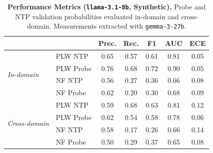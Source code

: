 \begin{table}[ht]
\centering
\begin{tabular}{ll ccccc}
\toprule
& & Prec. & Rec. & F1 & AUC & ECE \\
\midrule
\multirow{4}{*}{\textit{In-domain}}
& PLW NTP & 0.65 & 0.57 & 0.61 & 0.81 & 0.05 \\
& PLW Probe & 0.76 & 0.68 & 0.72 & 0.90 & 0.05 \\
& NF NTP & 0.56 & 0.27 & 0.36 & 0.66 & 0.08 \\
& NF Probe & 0.62 & 0.20 & 0.30 & 0.68 & 0.09 \\
\midrule
\multirow{4}{*}{\textit{Cross-domain}}
& PLW NTP & 0.59 & 0.68 & 0.63 & 0.81 & 0.12 \\
& PLW Probe & 0.62 & 0.54 & 0.58 & 0.78 & 0.06 \\
& NF NTP & 0.58 & 0.17 & 0.26 & 0.66 & 0.14 \\
& NF Probe & 0.50 & 0.29 & 0.37 & 0.65 & 0.08 \\
\bottomrule
\end{tabular}
\caption{\textbf{Performance Metrics (\texttt{llama-3.1-8b}, Synthetic).} Probe and NTP validation probabilities evaluated in-domain and cross-domain. Measurements extracted with \texttt{gemma-3-27b}.}
\label{tab:llama-3.1-8b-gemma-3-27b-head-syn}
\end{table}
